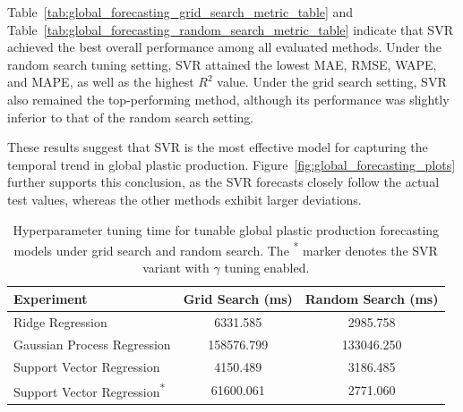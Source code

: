 
Table~\ref{tab:global_forecasting_grid_search_metric_table} and Table~\ref{tab:global_forecasting_random_search_metric_table} indicate that SVR achieved the best overall performance among all evaluated methods. Under the random search tuning setting, SVR attained the lowest MAE, RMSE, WAPE, and MAPE, as well as the highest \(R^2\) value. Under the grid search setting, SVR also remained the top-performing method, although its performance was slightly inferior to that of the random search setting.

These results suggest that SVR is the most effective model for capturing the temporal trend in global plastic production. Figure~\ref{fig:global_forecasting_plots} further supports this conclusion, as the SVR forecasts closely follow the actual test values, whereas the other methods exhibit larger deviations.

\begin{table}[!ht]
	\centering
	\caption{
		\centering Hyperparameter tuning time for tunable global plastic production forecasting models under grid search and random search. The \textsuperscript{*} marker denotes the SVR variant with \(\gamma\) tuning enabled.
	}
	\begin{tabular}{@{}lcc@{}}
		\toprule
		\textbf{Experiment}                          & \textbf{Grid Search (ms)} & \textbf{Random Search (ms)} \\
		\midrule
		Ridge Regression                             & 6331.585                  & 2985.758                    \\
		Gaussian Process Regression                  & 158576.799                & 133046.250                  \\
		Support Vector Regression                    & 4150.489                  & 3186.485                    \\
		Support Vector Regression\textsuperscript{*} & 61600.061                 & 2771.060                    \\
		\hline
	\end{tabular}
	\label{tab:forecasting_tuning_time}
\end{table}

